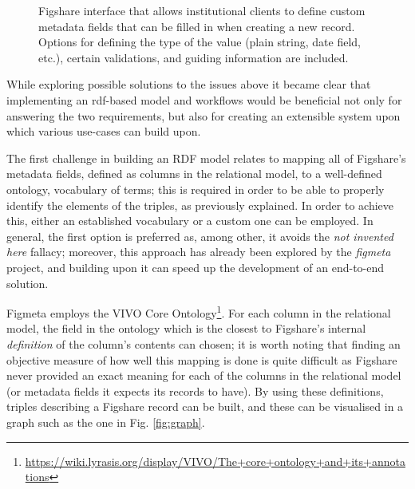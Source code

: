 \begin{enumerate}
    \begin{figure}[thpb]
    \centering
    \caption{Figshare interface that allows institutional clients to define custom metadata fields that can be filled in when creating a new record. Options for defining the type of the value (plain string, date field, etc.), certain validations, and guiding information are included.}
    \label{fig:caf}
\end{figure}

\end{enumerate}

While exploring possible solutions to the issues above it became clear that implementing an \gls{rdf}-based model and workflows would be beneficial not only for answering the two requirements, but also for creating an extensible system upon which various use-cases can build upon.

The first challenge in building an RDF model relates to mapping all of Figshare's metadata fields, defined as columns in the relational model, to a well-defined ontology, vocabulary of terms; this is required in order to be able to properly identify the elements of the triples, as previously explained. In order to achieve this, either an established vocabulary or a custom one can be employed. In general, the first option is preferred as, among other, it avoids the \emph{not invented here} fallacy; moreover, this approach has already been explored by the \emph{figmeta} project\cite{figmeta}, and building upon it can speed up the development of an end-to-end solution.

Figmeta employs the VIVO Core Ontology\footnote{\url{https://wiki.lyrasis.org/display/VIVO/The+core+ontology+and+its+annotations}}. For each column in the relational model, the field in the ontology which is the closest to Figshare's internal
\emph{definition} of the column's contents can chosen; it is worth noting that finding an objective measure of how well this mapping is done is quite difficult as Figshare never provided an exact meaning for each of the columns in the relational model (or metadata fields it expects its records to have). By using these definitions, triples describing a Figshare record can be built, and these can be visualised in a graph such as the one in Fig. \ref{fig:graph}.

